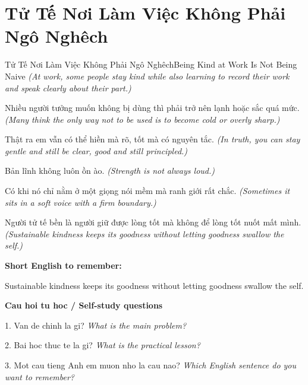 \section{Tử Tế Nơi Làm Việc Không Phải Ngô Nghêch}
\begin{truyen}{Tử Tế Nơi Làm Việc Không Phải Ngô Nghêch}{Being Kind at Work Is Not Being Naive}
\textit{(At work, some people stay kind while also learning to record their work and speak clearly about their part.)}

Nhiều người tưởng muốn không bị dùng thì phải trở nên lạnh hoặc sắc quá mức.
\textit{(Many think the only way not to be used is to become cold or overly sharp.)}

Thật ra em vẫn có thể hiền mà rõ, tốt mà có nguyên tắc.
\textit{(In truth, you can stay gentle and still be clear, good and still principled.)}

Bản lĩnh không luôn ồn ào.
\textit{(Strength is not always loud.)}

Có khi nó chỉ nằm ở một giọng nói mềm mà ranh giới rất chắc.
\textit{(Sometimes it sits in a soft voice with a firm boundary.)}

\end{truyen}

\begin{baihoc}
Người tử tế bền là người giữ được lòng tốt mà không để lòng tốt nuốt mất mình.
\textit{(Sustainable kindness keeps its goodness without letting goodness swallow the self.)}
\end{baihoc}

\begin{ghinhoanh}
\textbf{Short English to remember:}

Sustainable kindness keeps its goodness without letting goodness swallow the self.

\end{ghinhoanh}

\begin{tuhocnhanh}
\textbf{Cau hoi tu hoc / Self-study questions}

1. Van de chinh la gi? \textit{What is the main problem?}

2. Bai hoc thuc te la gi? \textit{What is the practical lesson?}

3. Mot cau tieng Anh em muon nho la cau nao? \textit{Which English sentence do you want to remember?}
\end{tuhocnhanh}
\ngancach

